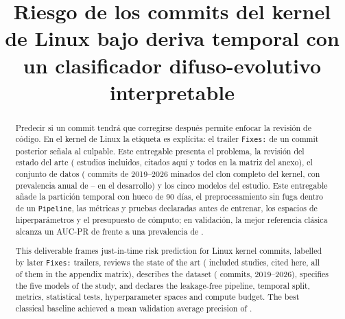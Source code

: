 \documentclass[conference,letterpaper]{IEEEtran}
\begin{document}
\title{Riesgo de los commits del kernel de Linux bajo deriva temporal con un clasificador difuso-evolutivo interpretable}

\author{
}

\maketitle

\begin{abstract}
Predecir si un commit tendrá que corregirse después permite enfocar la revisión de código. En el kernel de Linux la etiqueta es explícita: el trailer \texttt{Fixes:} de un commit posterior señala al culpable. Este entregable presenta el problema, la revisión del estado del arte (\nTotalIncluidos{} estudios incluidos, \nIncluidosCitados{} citados aquí y todos en la matriz del anexo), el conjunto de datos (\cifCommits{} commits de 2019--2026 minados del clon completo del kernel, con prevalencia anual de \cifPrevMin{}--\cifPrevMax{} en el desarrollo) y los cinco modelos del estudio. Este entregable añade la partición temporal con hueco de 90 días, el preprocesamiento sin fuga dentro de un \texttt{Pipeline}, las métricas y pruebas declaradas antes de entrenar, los espacios de hiperparámetros y el presupuesto de cómputo; en validación, la mejor referencia clásica alcanza un AUC-PR de \cifEtresValGB{} frente a una prevalencia de \cifEtresValMay{}.
\end{abstract}

\begingroup\renewcommand{\abstractname}{Abstract}
\begin{abstract}
This deliverable frames just-in-time risk prediction for Linux kernel commits, labelled by later \texttt{Fixes:} trailers, reviews the state of the art (\nTotalIncluidos{} included studies, \nIncluidosCitados{} cited here, all of them in the appendix matrix), describes the dataset (\cifCommits{} commits, 2019--2026), specifies the five models of the study, and declares the leakage-free pipeline, temporal split, metrics, statistical tests, hyperparameter spaces and compute budget. The best classical baseline achieved a mean validation average precision of \cifEtresValGB{}.
\end{abstract}\endgroup
\end{document}
